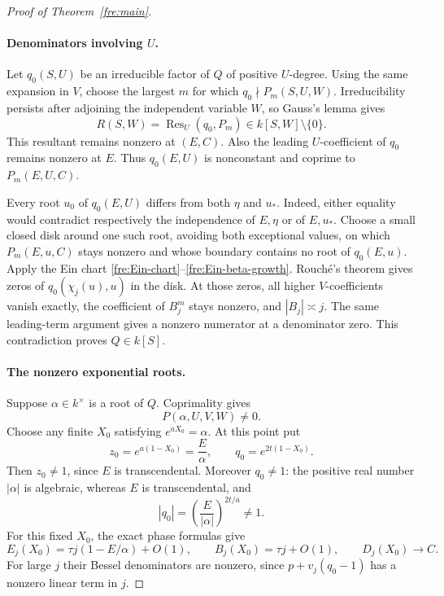 \documentclass[11pt]{article}
\theoremstyle{definition}
\theoremstyle{remark}
\begin{document}
\begin{proof}[Proof of Theorem~\ref{fre:main}]
\paragraph{Denominators involving $U$.}
Let $q_0(S,U)$ be an irreducible factor of $Q$ of positive
$U$-degree.  Using the same expansion in $V$, choose the largest
$m$ for which $q_0\nmid P_m(S,U,W)$.  Irreducibility persists after
adjoining the independent variable $W$, so Gauss's lemma gives
\[
 R(S,W)=\operatorname{Res}_U(q_0,P_m)
          \in k[S,W]\setminus\{0\}.
\]
This resultant remains nonzero at $(E,C)$.  Also the leading
$U$-coefficient of $q_0$ remains nonzero at $E$.  Thus
$q_0(E,U)$ is nonconstant and coprime to $P_m(E,U,C)$.

Every root $u_0$ of $q_0(E,U)$ differs from both $\eta$ and
$u_*$.  Indeed, either equality would contradict respectively
the independence of $E,\eta$ or of $E,u_*$.  Choose a small closed
disk around one such root, avoiding both exceptional values, on
which $P_m(E,u,C)$ stays nonzero and whose boundary contains no
root of $q_0(E,u)$.  Apply the Ein chart
\eqref{fre:Ein-chart}--\eqref{fre:Ein-beta-growth}.
Rouch\'e's theorem gives zeros of $q_0(\chi_j(u),u)$ in the disk.
At those zeros, all higher $V$-coefficients vanish exactly,
the coefficient of $B_j^m$ stays nonzero, and $|B_j|\asymp j$.
The same leading-term argument gives a nonzero numerator at a
denominator zero.  This contradiction proves $Q\in k[S]$.

\paragraph{The nonzero exponential roots.}
Suppose $\alpha\in k^\times$ is a root of $Q$.  Coprimality gives
\[
 P(\alpha,U,V,W)\ne0.
\]
Choose any finite $X_0$ satisfying $e^{aX_0}=\alpha$.  At this point
put
\[
 z_0=e^{a(1-X_0)}=\frac{E}{\alpha},\qquad
 q_0=e^{2t(1-X_0)}.
\]
Then $z_0\ne1$, since $E$ is transcendental.  Moreover $q_0\ne1$:
the positive real number $|\alpha|$ is algebraic, whereas $E$ is
transcendental, and
\[
 |q_0|=\left(\frac{E}{|\alpha|}\right)^{2t/a}\ne1.
\]
For this fixed $X_0$, the exact phase formulas give
\begin{equation}\label{fre:fixed-exp-growth}
 E_j(X_0)=\tau j(1-E/\alpha)+O(1),\qquad
 B_j(X_0)=\tau j+O(1),\qquad
 D_j(X_0)\longrightarrow C.
\end{equation}
For large $j$ their Bessel denominators are nonzero, since
$p+v_j(q_0-1)$ has a nonzero linear term in $j$.


\end{proof}
\end{document}
